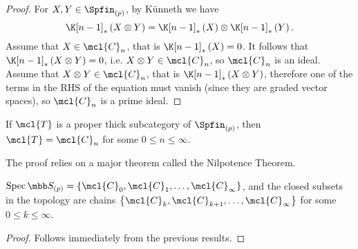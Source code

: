 \begin{proof}
	For $X,Y \in \Spfin_{\left(p\right)}$, by K\"unneth we have 
	$$
	\K[n-1]_*\left(X \otimes  Y\right)
	= \K[n-1]_*\left(X\right) \otimes \K[n-1]_*\left(Y\right).
	$$
	Assume that $X \in \mcl{C}_n$, that is $\K[n-1]_*\left(X\right) = 0$.
	It follows that $\K[n-1]_*\left(X \otimes  Y\right) = 0$, i.e. $X \otimes Y \in \mcl{C}_n$, so $\mcl{C}_n$ is an ideal.
	Assume that $X \otimes Y\in \mcl{C}_n$, that is $\K[n-1]_*\left(X \otimes  Y\right)$, therefore one of the terms in the RHS of the equation must vanish (since they are graded vector spaces), so $\mcl{C}_n$ is a prime ideal.
\end{proof}

\begin{theorem}\label{thick-subcategory-thm}
	If $\mcl{T}$ is a proper thick subcategory of $\Spfin_{\left(p\right)}$, then $\mcl{T} = \mcl{C}_n$ for some $0 \leq n \leq \infty$.
\end{theorem}

\begin{remark}
	The proof relies on a major theorem called the Nilpotence Theorem.
\end{remark}

\begin{corollary}
	$\spec \SS_{\left(p\right)} = \left\{ \mcl{C}_0, \mcl{C}_1, \dotsc, \mcl{C}_\infty \right\}$,
	and the closed subsets in the topology are chains
	$\left\{ \mcl{C}_k, \mcl{C}_{k+1}, \dotsc, \mcl{C}_\infty \right\}$
	for some $0 \leq k \leq \infty$.
\end{corollary}

\begin{proof}
	Follows immediately from the previous results.
\end{proof}

